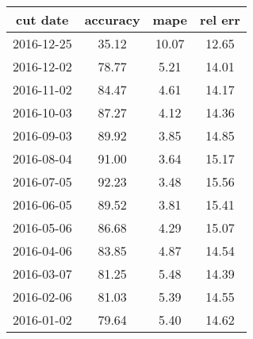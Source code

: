 \begin{tabular}{cccc}
\toprule
  \textbf{cut date} & \textbf{accuracy} & \textbf{mape} & \textbf{rel err} \\
\midrule
2016-12-25 &             35.12 &         10.07 &            12.65 \\
2016-12-02 &             78.77 &          5.21 &            14.01 \\
2016-11-02 &             84.47 &          4.61 &            14.17 \\
2016-10-03 &             87.27 &          4.12 &            14.36 \\
2016-09-03 &             89.92 &          3.85 &            14.85 \\
2016-08-04 &             91.00 &          3.64 &            15.17 \\
2016-07-05 &             92.23 &          3.48 &            15.56 \\
2016-06-05 &             89.52 &          3.81 &            15.41 \\
2016-05-06 &             86.68 &          4.29 &            15.07 \\
2016-04-06 &             83.85 &          4.87 &            14.54 \\
2016-03-07 &             81.25 &          5.48 &            14.39 \\
2016-02-06 &             81.03 &          5.39 &            14.55 \\
2016-01-02 &             79.64 &          5.40 &            14.62 \\
\bottomrule
\end{tabular}
